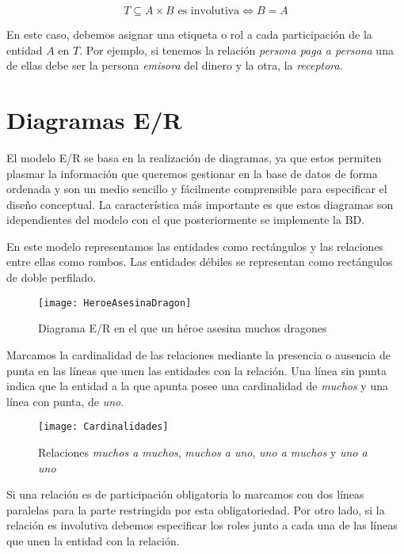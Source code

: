 \[T\subseteq A\times B\text{ es involutiva}\Leftrightarrow B=A\]

En este caso, debemos asignar una etiqueta o rol a cada participación de la entidad $A$ en $T$.
Por ejemplo, si tenemos la relación \textit{persona paga a persona} una de ellas debe ser la persona \textit{emisora} del dinero y la otra, la \textit{receptora}.

\section{Diagramas E/R}

El modelo E/R se basa en la realización de diagramas, ya que estos permiten plasmar la información que queremos gestionar en la base de datos de forma ordenada y son un medio sencillo y fácilmente comprensible para especificar el diseño conceptual.
La característica más importante es que estos diagramas son idependientes del modelo con el que posteriormente se implemente la BD\@.

En este modelo representamos las entidades como rectángulos y las relaciones entre ellas como rombos.
Las entidades débiles se representan como rectángulos de doble perfilado.

\begin{figure}[h]
\begin{center}
	\texttt{[image: HeroeAsesinaDragon]}
\end{center}
\caption{Diagrama E/R en el que un héroe asesina muchos dragones}
\end{figure}

Marcamos la cardinalidad de las relaciones mediante la presencia o ausencia de punta en las líneas que unen las entidades con la relación.
Una línea sin punta indica que la entidad a la que apunta posee una cardinalidad de \textit{muchos} y una línea con punta, de \textit{uno}.

\begin{figure}[h]
\begin{center}
	\texttt{[image: Cardinalidades]}
\end{center}
\caption{Relaciones \textit{muchos a muchos}, \textit{muchos a uno}, \textit{uno a muchos} y \textit{uno a uno}}
\end{figure}

Si una relación es de participación obligatoria lo marcamos con dos líneas paralelas para la parte restringida por esta obligatoriedad.
Por otro lado, si la relación es involutiva debemos especificar los roles junto a cada una de las líneas que unen la entidad con la relación.

